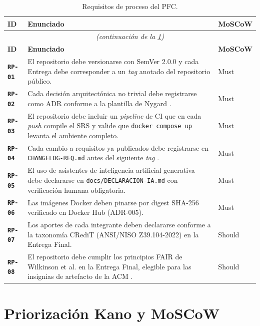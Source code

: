 \documentclass[11pt,a4paper,twoside]{report}
\newcommand{\reqid}[1]{\texttt{\textbf{#1}}}
\begin{document}
\begin{longtable}{@{}p{1.2cm}p{12.5cm}p{1.3cm}@{}}
    \caption{Requisitos de proceso del PFC.}
    \label{tab:rp}\\
    \toprule
    \textbf{ID} & \textbf{Enunciado} & \textbf{MoSCoW} \\
    \midrule
    \endfirsthead
    \multicolumn{3}{c}{\itshape (continuaci\'on de la \cref{tab:rp})}\\
    \toprule
    \textbf{ID} & \textbf{Enunciado} & \textbf{MoSCoW} \\
    \midrule
    \endhead

    \reqid{RP-01} & El repositorio debe versionarse con SemVer 2.0.0 \cite{prestonwerner2013semver} y cada Entrega debe corresponder a un \emph{tag} anotado del repositorio p\'ublico. & Must \\
    \reqid{RP-02} & Cada decisi\'on arquitect\'onica no trivial debe registrarse como ADR conforme a la plantilla de Nygard \cite{nygard2011adr}. & Must \\
    \reqid{RP-03} & El repositorio debe incluir un \emph{pipeline} de CI que en cada \emph{push} compile el SRS y valide que \texttt{docker compose up} levanta el ambiente completo. & Must \\
    \reqid{RP-04} & Cada cambio a requisitos ya publicados debe registrarse en \texttt{CHANGELOG-REQ.md} antes del siguiente \emph{tag} \cite{iso29148}. & Must \\
    \reqid{RP-05} & El uso de asistentes de inteligencia artificial generativa debe declararse en \texttt{docs/DECLARACION-IA.md} con verificaci\'on humana obligatoria. & Must \\
    \reqid{RP-06} & Las im\'agenes Docker deben pinarse por digest SHA-256 verificado en Docker Hub (ADR-005). & Must \\
    \reqid{RP-07} & Los aportes de cada integrante deben declararse conforme a la taxonom\'ia CRediT (ANSI/NISO Z39.104-2022) \cite{niso2022credit} en la Entrega Final. & Should \\
    \reqid{RP-08} & El repositorio debe cumplir los principios FAIR de Wilkinson et al. \cite{wilkinson2016fair} en la Entrega Final, elegible para las insignias de artefacto de la ACM \cite{acm2020artifact}. & Should \\
    \bottomrule
\end{longtable}

\section{Priorizaci\'on Kano y MoSCoW}
\label{sec:priorizacion}
\end{document}

